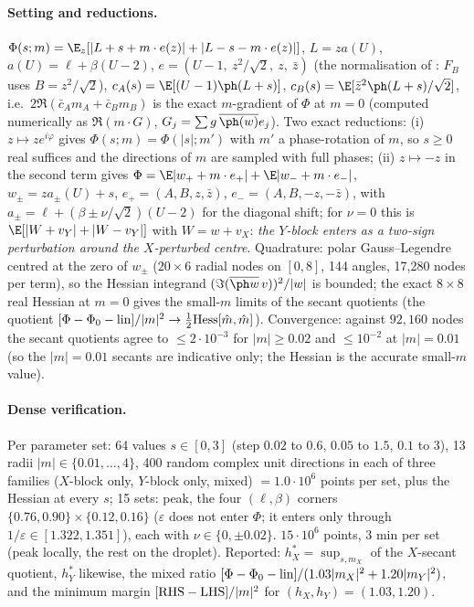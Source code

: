 \paragraph{Setting and reductions.} $\Phi(s;m)=\E_z[|L+s+m\cdot e(z)|+|L-s-m\cdot e(z)|]$, $L=za(U)$, $a(U)=\ell+\beta(U-2)$, $e=(U-1,\ z^2/\sqrt2,\ z,\ \bar z)$ (the normalisation of
: $F_B$ uses $B=z^2/\sqrt2$), $c_A(s)=\E[(U-1)\ph(L+s)]$, $c_B(s)=\E[\bar z^2\ph(L+s)/\sqrt2]$, i.e.\ $2\Re(\bar c_Am_A+\bar c_Bm_B)$ is the exact $m$-gradient of $\Phi$ at $m=0$
(computed numerically as $\Re(m\cdot G)$, $G_j=\sum g\,\overline{\ph(w)}e_j$). Two exact reductions: (i) $z\mapsto ze^{i\varphi}$ gives $\Phi(s;m)=\Phi(|s|;m')$ with $m'$ a phase-rotation of $m$, so
$s\ge0$ real suffices and the directions of $m$ are sampled with full phases; (ii) $z\mapsto-z$ in the second term gives $\Phi=\E|w_++m\cdot e_+|+\E|w_-+m\cdot e_-|$, $w_\pm=za_\pm(U)+s$,
$e_+=(A,B,z,\bar z)$, $e_-=(A,B,-z,-\bar z)$, with $a_\pm=\ell+(\beta\pm\nu/\sqrt2)(U-2)$ for the diagonal shift; for $\nu=0$ this is $\E[|W+v_Y|+|W-v_Y|]$ with $W=w+v_X$: \emph{the $Y$-block
enters as a two-sign perturbation around the $X$-perturbed centre}. Quadrature: polar Gauss--Legendre centred at the zero of $w_\pm$ ($20\times6$ radial nodes on $[0,8]$, 144 angles,
17,280 nodes per term), so the Hessian integrand $(\Im(\overline{\ph w}\,v))^2/|w|$ is bounded; the exact $8\times8$ real Hessian at $m=0$ gives the small-$m$ limits of the secant quotients (the
quotient $[\Phi-\Phi_0-{\rm lin}]/|m|^2\to\frac12{\rm Hess}[\hat m,\hat m]$). Convergence: against $92{,}160$ nodes the secant quotients agree to $\le2\cdot10^{-3}$ for $|m|\ge0.02$ and
$\le10^{-2}$ at $|m|=0.01$ (so the $|m|=0.01$ secants are indicative only; the Hessian is the accurate small-$m$ value).

\paragraph{Dense verification.} Per parameter set: 64 values $s\in[0,3]$ (step $0.02$ to $0.6$, $0.05$ to $1.5$, $0.1$ to $3$), 13 radii $|m|\in\{0.01,\ldots,4\}$, 400 random complex unit
directions in each of three families ($X$-block only, $Y$-block only, mixed) $=1.0\cdot10^6$ points per set, plus the Hessian at every $s$; 15 sets: peak, the four $(\ell,\beta)$ corners
$\{0.76,0.90\}\times\{0.12,0.16\}$ ($\varepsilon$ does not enter $\Phi$; it enters only through $1/\varepsilon\in[1.322,1.351]$), each with $\nu\in\{0,\pm0.02\}$. $15\cdot10^6$ points, 3 min
per set (peak locally, the rest on the droplet). Reported: $h_X^*=\sup_{s,m_X}$ of the $X$-secant quotient, $h_Y^*$ likewise, the mixed ratio $[\Phi-\Phi_0-{\rm lin}]/(1.03|m_X|^2+1.20|m_Y|^2)$,
and the minimum margin $[{\rm RHS}-{\rm LHS}]/|m|^2$ for $(h_X,h_Y)=(1.03,1.20)$.

